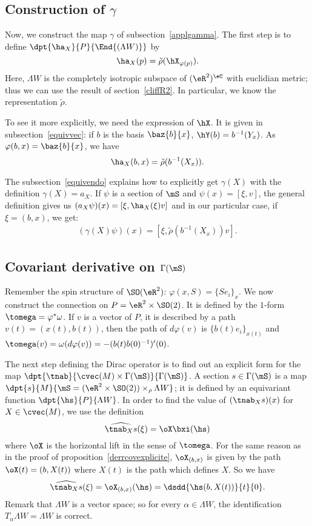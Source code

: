 \subsection{Construction of \texorpdfstring{$\gamma$}{g}}

Now, we construct the map $\gamma$ of subsection~\ref{applgamma}. The first step is to define $\dpt{\ha_X}{P}{\End{(\Lambda W )}}$ by
\[
\ha_X(p)=\tilde\rho(\hX_{\varphi(p)}).
\]
Here, $\Lambda W $ is the completely isotropic subspace of $(\eR^2)^{\eC}$ with euclidian metric; thus we can use the result of section~\ref{cliffR2}. In particular, we know the representation $\tilde\rho$.

To see it more explicitly, we need the expression of $\hX$. It is given in subsection~\ref{equivvec}: if $b$ is the basis $\baz{b}{x}$, $\hY(b)=b^{-1}(Y_x)$. As $\varphi(b,x)=\baz{b}{x}$, we have
\[
\ha_X(b,x)=\tilde\rho(b^{-1}(X_x)).
\]

The subsection~\ref{equivendo} explains how to explicitly get $\gamma(X)$ with the definition $\gamma(X)=a_X$. If $\psi$ is a section of $\mS$ and $\psi(x)=[\xi,v]$, the general definition gives us $(a_X\psi)(x)=[\xi,\ha_X(\xi)v]$ and in our particular case, if $\xi=(b,x)$, we get:
\begin{eqnarray}
 \label{gammaX}(\gamma(X)\psi)(x)=[\xi,\tilde\rho(b^{-1}(X_x))v].
\end{eqnarray}

\subsection{Covariant derivative on \texorpdfstring{$\protect\Gamma(\mS)$}{S}}

Remember the spin structure of $\SO(\eR^2)$: $\varphi(x,S)=\{Se_i\}_x$. We now construct the connection on $P=\eR^2\times \SO(2)$. It is defined by the $1$-form $\tomega=\varphi^*\omega$. If $v$ is a vector of $P$, it is described by a path $v(t)=(x(t),b(t))$, then the path of $d\varphi(v)$ is $\{b(t)e_i\}_{x(t)}$ and $\tomega(v)=\omega(d\varphi(v))=-(b(t)b(0)^{-1})'(0)$.

The next step defining the Dirac operator is to find out an explicit form for the map $\dpt{\tnab}{\cvec(M)\times\Gamma(\mS)}{\Gamma(\mS)}$. A section $s\in\Gamma(\mS)$ is a map $\dpt{s}{M}{\mS=(\eR^2\times \SO(2))\times_{\rho}\Lambda W }$; it is defined by an equivariant function $\dpt{\hs}{P}{\Lambda W }$. In order to find the value of $(\tnab_Xs)(x)$ for $X\in\cvec(M)$, we use the definition
\[
 \widehat{\tnab_Xs}(\xi)=\oX\bxi(\hs)
\]
where $\oX$ is the horizontal lift in the sense of $\tomega$. For the same reason as in the proof of proposition~\ref{derrcovexplicite}, $\oX_{(b,x)}$ is given by the path $\oX(t)=(b,X(t))$ where $X(t)$ is the path which defines $X$. So we have
\[
 \widehat{\tnab_Xs}(\xi)=\oX_{(b,x)}(\hs)=\dsdd{\hs(b,X(t))}{t}{0}.
\]
Remark that $\Lambda W $ is a vector space; so for every $\alpha\in\Lambda W $, the identification $T_{\alpha}\Lambda W =\Lambda W $ is correct.

